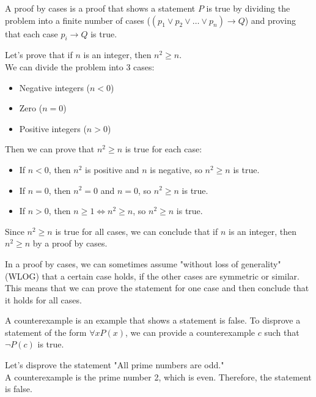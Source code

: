 \begin{definition}
    A proof by cases is a proof that shows a statement $P$ is true by dividing the problem into a finite number of cases ($(p_1 \lor p_2 \lor \ldots \lor p_n) \to Q$) and proving that each case $p_i \to Q$ is true.
\end{definition}
\begin{eg}
    Let's prove that if $n$ is an integer, then $n^2 \geq n$. \\
    We can divide the problem into 3 cases:
    \begin{itemize}[itemsep=1pt,label=$\circ$]
        \item Negative integers ($n < 0$)
        \item Zero ($n = 0$)
        \item Positive integers ($n > 0$)
    \end{itemize}
    Then we can prove that $n^2 \geq n$ is true for each case:
    \begin{itemize}[itemsep=1pt,label=$\circ$]
        \item If $n < 0$, then $n^2$ is positive and $n$ is negative, so $n^2 \geq n$ is true.
        \item If $n = 0$, then $n^2 = 0$ and $n = 0$, so $n^2 \geq n$ is true.
        \item If $n > 0$, then $n \geq 1 \iff n^2 \geq n$, so $n^2 \geq n$ is true.
    \end{itemize}
    Since $n^2 \geq n$ is true for all cases, we can conclude that if $n$ is an integer, then $n^2 \geq n$ by a proof by cases.
\end{eg}

\begin{definition}
    In a proof by cases, we can sometimes assume "without loss of generality" (WLOG) that a certain case holds, if the other cases are symmetric or similar. This means that we can prove the statement for one case and then conclude that it holds for all cases.
\end{definition}

\begin{definition}[Counterexample]
    A counterexample is an example that shows a statement is false. To disprove a statement of the form $\forall x P(x)$, we can provide a counterexample $c$ such that $\neg P(c)$ is true.
\end{definition}
\begin{eg}
    Let's disprove the statement "All prime numbers are odd." \\
    A counterexample is the prime number 2, which is even. Therefore, the statement is false.
\end{eg}

